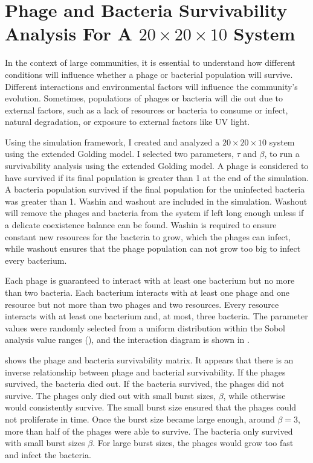 \section{Phage and Bacteria Survivability Analysis For A $20\times20\times10$ System}
In the context of large communities, it is essential to understand how different conditions will influence whether a phage or bacterial population will survive. 
Different interactions and environmental factors will influence the community's evolution. 
Sometimes, populations of phages or bacteria will die out due to external factors, such as a lack of resources or bacteria to consume or infect, natural degradation, or exposure to external factors like UV light. 

Using the simulation framework, I created and analyzed a $20\times20\times10$ system using the extended Golding model. 
I selected two parameters, $\tau$ and $\beta$, to run a survivability analysis using the extended Golding model. 
A phage is considered to have survived if its final population is greater than 1 at the end of the simulation. 
A bacteria population survived if the final population for the uninfected bacteria was greater than 1. 
Washin and washout are included in the simulation. 
Washout will remove the phages and bacteria from the system if left long enough unless if a delicate coexistence balance can be found. 
Washin is required to ensure constant new resources for the bacteria to grow, which the phages can infect, while washout ensures that the phage population can not grow too big to infect every bacterium. 

Each phage is guaranteed to interact with at least one bacterium but no more than two bacteria. 
Each bacterium interacts with at least one phage and one resource but not more than two phages and two resources. 
Every resource interacts with at least one bacterium and, at most, three bacteria. 
The parameter values were randomly selected from a uniform distribution within the Sobol analysis value ranges (), and the interaction diagram is shown in . 

 shows the phage and bacteria survivability matrix. 
It appears that there is an inverse relationship between phage and bacterial survivability. 
If the phages survived, the bacteria died out. 
If the bacteria survived, the phages did not survive. 
The phages only died out with small burst sizes, $\beta$, while otherwise would consistently survive. The small burst size ensured that the phages could not proliferate in time. 
Once the burst size became large enough, around $\beta = 3$, more than half of the phages were able to survive. 
The bacteria only survived with small burst sizes $\beta$. 
For large burst sizes, the phages would grow too fast and infect the bacteria. 

